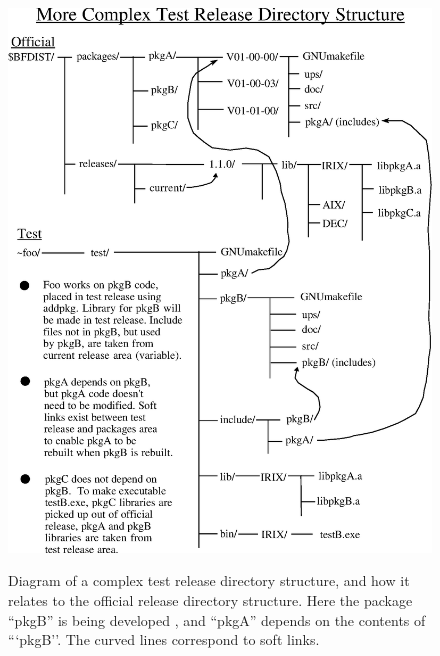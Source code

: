 \documentclass[12pt]{article}
\begin{document}
\vspace*{1.0in}
\begin{figure}[bht!]
\centerline{\includegraphics[width=5in]{run_2_development.eps}}
\caption[Complex Test Release Directory Structure]{ 
Diagram of a complex test release directory structure, and how it relates to the
official release directory structure.  Here the package ``pkgB'' is being
developed , and ``pkgA'' depends on the contents of ```pkgB''. The curved lines 
correspond to soft links.}
\label{fig_testrel}
\end{figure}
\clearpage 
\end{document}
